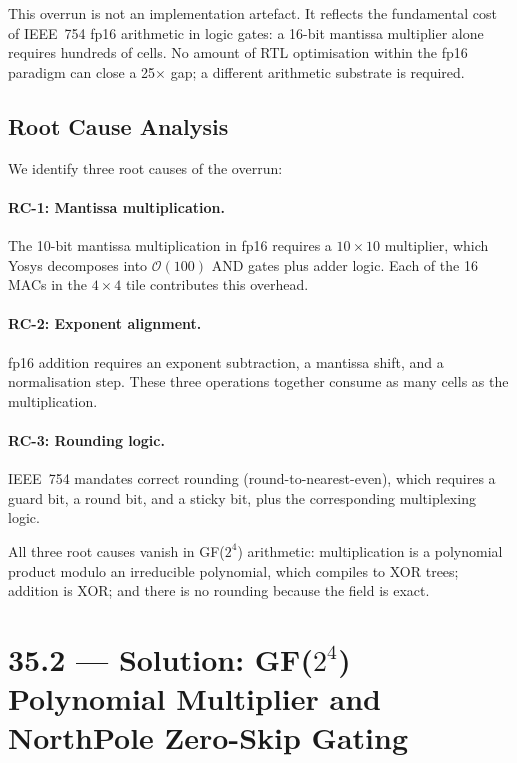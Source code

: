 This overrun is not an implementation artefact.
It reflects the fundamental cost of IEEE~754 fp16 arithmetic in logic
gates: a 16-bit mantissa multiplier alone requires hundreds of cells.
No amount of RTL optimisation within the fp16 paradigm can close a
25\(\times\) gap; a different arithmetic substrate is required.

\subsection{Root Cause Analysis}

We identify three root causes of the overrun:

\paragraph{RC-1: Mantissa multiplication.}
The 10-bit mantissa multiplication in fp16 requires a
\(10 \times 10\) multiplier, which Yosys decomposes into
\(\mathcal{O}(100)\) AND gates plus adder logic.
Each of the 16 MACs in the \(4 \times 4\) tile contributes this overhead.

\paragraph{RC-2: Exponent alignment.}
fp16 addition requires an exponent subtraction, a mantissa shift, and
a normalisation step.
These three operations together consume as many cells as the multiplication.

\paragraph{RC-3: Rounding logic.}
IEEE~754 mandates correct rounding (round-to-nearest-even), which
requires a guard bit, a round bit, and a sticky bit, plus the
corresponding multiplexing logic.

All three root causes vanish in GF(\(2^4\)) arithmetic:
multiplication is a polynomial product modulo an irreducible polynomial,
which compiles to XOR trees; addition is XOR; and there is no rounding
because the field is exact.

\section{35.2 --- Solution: GF(\(2^4\)) Polynomial Multiplier and NorthPole Zero-Skip Gating}
\label{sec:glava35-solution}


